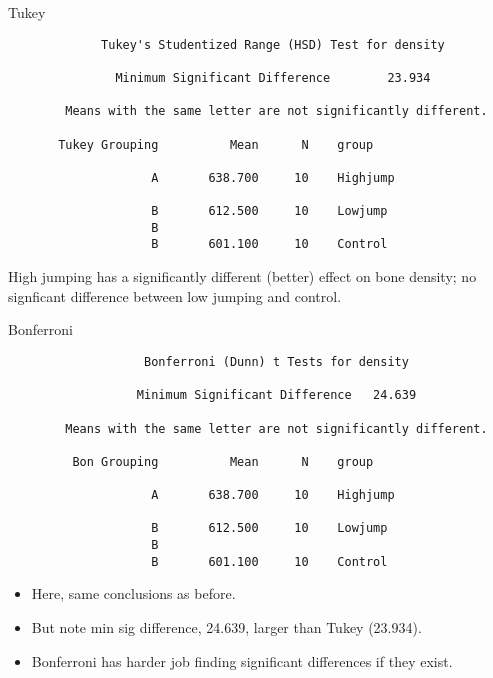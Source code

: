\documentclass[pdf]{prosper}
\begin{document}
\begin{slide}{Tukey}
  
{\scriptsize
\begin{verbatim}
             Tukey's Studentized Range (HSD) Test for density

               Minimum Significant Difference        23.934

        Means with the same letter are not significantly different.

       Tukey Grouping          Mean      N    group

                    A       638.700     10    Highjump

                    B       612.500     10    Lowjump
                    B
                    B       601.100     10    Control

\end{verbatim}
}

High jumping has a significantly different (better) effect on bone density; no signficant difference between low jumping and control.


\end{slide}

\begin{slide}{Bonferroni}

{\scriptsize
\begin{verbatim}
                   Bonferroni (Dunn) t Tests for density

                  Minimum Significant Difference   24.639

        Means with the same letter are not significantly different.
 
         Bon Grouping          Mean      N    group

                    A       638.700     10    Highjump
                                                      
                    B       612.500     10    Lowjump 
                    B                                 
                    B       601.100     10    Control 

\end{verbatim}
}

\begin{itemize}
\item Here, same conclusions as before.
\item But note min sig difference, 24.639, larger than Tukey (23.934).
\item Bonferroni has harder job finding significant differences if they exist.
\end{itemize}
  
\end{slide}
\end{document}

